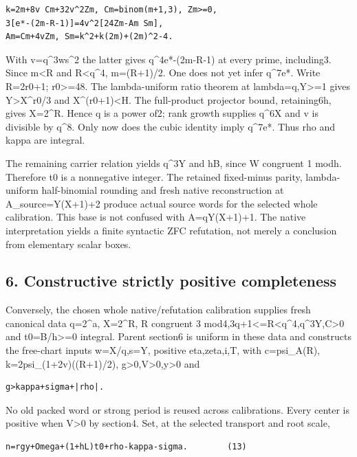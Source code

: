\begin{verbatim}
k=2m+8v Cm+32v^2Zm, Cm=binom(m+1,3), Zm>=0,
3[e*-(2m-R-1)]=4v^2[24Zm-Am Sm],
Am=Cm+4vZm, Sm=k^2+k(2m)+(2m)^2-4.
\end{verbatim}

With v=q\^{}3ws\^{}2 the latter gives q\^{}4\textbar e*-(2m-R-1) at
every prime, including3. Since m\textless R and R\textless q\^{}4,
m=(R+1)/2. One does not yet infer q\^{}7\textbar e*. Write R=2r0+1;
r0\textgreater=48. The lambda-uniform ratio theorem at
lambda=q,Y\textgreater=1 gives Y\textgreater X\^{}r0/3 and
X\^{}(r0+1)\textless H. The full-product projector bound, retaining6h,
gives X=2\^{}R. Hence q is a power of2; rank growth supplies
q\^{}6\textbar X and v is divisible by q\^{}8. Only now does the cubic
identity imply q\^{}7\textbar e*. Thus rho and kappa are integral.

The remaining carrier relation yields q\^{}3\textbar Y and h\textbar B,
since W congruent 1 modh. Therefore t0 is a nonnegative integer. The
retained fixed-minus parity, lambda-uniform half-binomial rounding and
fresh native reconstruction at A\_source=Y(X+1)+2 produce actual source
words for the selected whole calibration. This base is not confused with
A=qY(X+1)+1. The native interpretation yields a finite syntactic ZFC
refutation, not merely a conclusion from elementary scalar boxes.

\subsection{6. Constructive strictly positive
completeness}\label{constructive-strictly-positive-completeness}

Conversely, the chosen whole native/refutation calibration supplies
fresh canonical data q=2\^{}a, X=2\^{}R, R congruent 3
mod4,3q+1\textless=R\textless q\^{}4,q\^{}3\textbar Y,C\textgreater0 and
t0=B/h\textgreater=0 integral. Parent section6 is uniform in these data
and constructs the free-chart inputs w=X/q,s=Y, positive eta,zeta,i,T,
with c=psi\_A(R), k=2psi\_(1+2v)((R+1)/2),
g\textgreater0,V\textgreater0,y\textgreater0 and

\begin{verbatim}
g>kappa+sigma+|rho|.
\end{verbatim}

No old packed word or strong period is reused across calibrations. Every
center is positive when V\textgreater0 by section4. Set, at the selected
transport and root scale,

\begin{verbatim}
n=rgy+Omega+(1+hL)t0+rho-kappa-sigma.        (13)
\end{verbatim}

